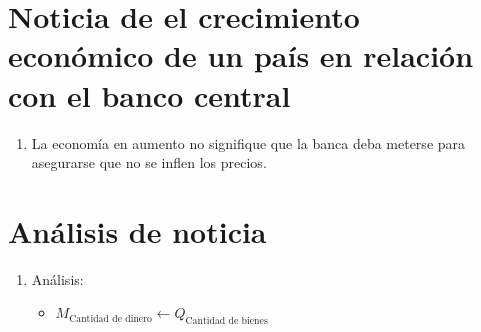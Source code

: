 \section{Noticia de el crecimiento económico de un país en relación con el banco central}
\begin{enumerate}
    \item La economía en aumento no signifique que la banca deba meterse para asegurarse que no se inflen los precios.  
\end{enumerate} %


\section{Análisis de noticia}
\begin{enumerate}
    \item Análisis:
        \begin{itemize}
            \item $M_{\text{Cantidad de dinero}} \leftarrow Q_{\text{Cantidad de bienes}}$ 
        \end{itemize}
\end{enumerate}

